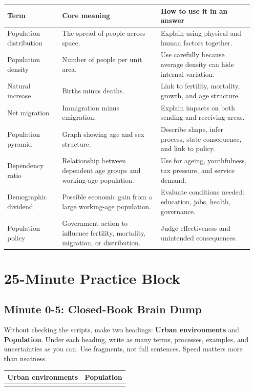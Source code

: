 \documentclass[11pt,a4paper]{article}
\renewcommand{\arraystretch}{1.22}
\newcommand{\term}[1]{\textcolor{HeadingBlue}{\textbf{#1}}}
\begin{document}
\begin{tabularx}{\textwidth}{L{0.24\textwidth}Y Y}
\toprule
\textbf{Term} & \textbf{Core meaning} & \textbf{How to use it in an answer} \\
\midrule
Population distribution & The spread of people across space. & Explain using
physical and human factors together. \\
Population density & Number of people per unit area. & Use carefully because
average density can hide internal variation. \\
Natural increase & Births minus deaths. & Link to fertility, mortality, growth,
and age structure. \\
Net migration & Immigration minus emigration. & Explain impacts on both sending
and receiving areas. \\
Population pyramid & Graph showing age and sex structure. & Describe shape,
infer process, state consequence, and link to policy. \\
Dependency ratio & Relationship between dependent age groups and working-age
population. & Use for ageing, youthfulness, tax pressure, and service demand. \\
Demographic dividend & Possible economic gain from a large working-age
population. & Evaluate conditions needed: education, jobs, health, governance. \\
Population policy & Government action to influence fertility, mortality,
migration, or distribution. & Judge effectiveness and unintended consequences. \\
\bottomrule
\end{tabularx}

\newpage

\section{25-Minute Practice Block}

\subsection{Minute 0-5: Closed-Book Brain Dump}

Without checking the scripts, make two headings:
\term{Urban environments} and \term{Population}. Under each heading, write as
many terms, processes, examples, and uncertainties as you can. Use fragments,
not full sentences. Speed matters more than neatness.

\begin{center}
\renewcommand{\arraystretch}{1.45}
\begin{tabularx}{0.96\textwidth}{Y Y}
\toprule
\textbf{Urban environments} & \textbf{Population} \\
\midrule
\rule{0pt}{4.4cm} & \rule{0pt}{4.4cm} \\
\bottomrule
\end{tabularx}
\end{center}
\end{document}
